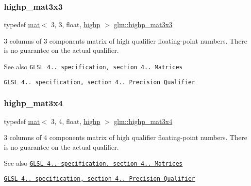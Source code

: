 \subsubsection{\texorpdfstring{highp\+\_\+mat3x3}{highp\_mat3x3}}
{\footnotesize\ttfamily typedef \hyperlink{structglm_1_1mat}{mat}$<$ 3, 3, float, \hyperlink{namespaceglm_a36ed105b07c7746804d7fdc7cc90ff25ac6f7eab42eacbb10d59a58e95e362074}{highp} $>$ \hyperlink{group__core__precision_ga83105b0c326393a133a43c426aae2a9c}{glm\+::highp\+\_\+mat3x3}}

3 columns of 3 components matrix of high qualifier floating-\/point numbers. There is no guarantee on the actual qualifier.

\begin{DoxySeeAlso}{See also}
\href{http://www.opengl.org/registry/doc/GLSLangSpec.4.20.8.pdf}{\tt G\+L\+SL 4.. specification, section 4.. Matrices} 

\href{http://www.opengl.org/registry/doc/GLSLangSpec.4.20.8.pdf}{\tt G\+L\+SL 4.. specification, section 4.. Precision Qualifier} 
\end{DoxySeeAlso}
\mbox{\label{group__core__precision_ga201566a8dbec6e27bec9e8e96ed4cdb6}} 
\subsubsection{\texorpdfstring{highp\+\_\+mat3x4}{highp\_mat3x4}}
{\footnotesize\ttfamily typedef \hyperlink{structglm_1_1mat}{mat}$<$ 3, 4, float, \hyperlink{namespaceglm_a36ed105b07c7746804d7fdc7cc90ff25ac6f7eab42eacbb10d59a58e95e362074}{highp} $>$ \hyperlink{group__core__precision_ga201566a8dbec6e27bec9e8e96ed4cdb6}{glm\+::highp\+\_\+mat3x4}}

3 columns of 4 components matrix of high qualifier floating-\/point numbers. There is no guarantee on the actual qualifier.

\begin{DoxySeeAlso}{See also}
\href{http://www.opengl.org/registry/doc/GLSLangSpec.4.20.8.pdf}{\tt G\+L\+SL 4.. specification, section 4.. Matrices} 

\href{http://www.opengl.org/registry/doc/GLSLangSpec.4.20.8.pdf}{\tt G\+L\+SL 4.. specification, section 4.. Precision Qualifier} 
\end{DoxySeeAlso}
\mbox{\label{group__core__precision_gab46132805773d55f00fce859bc71e799}} 

